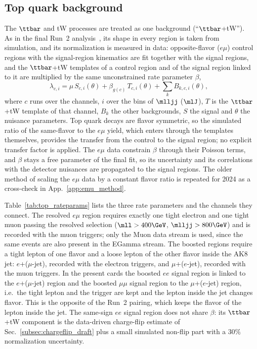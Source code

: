 \subsection{Top quark background}
\label{subsec:top_draft}

The $\ttbar$ and tW processes are treated as one background (``$\ttbar$+tW'').
As in the final Run~2 analysis~\cite{bib:AN19083}, its shape in every region is
taken from simulation, and its normalization is measured in data: opposite-flavor
($e\mu$) control regions with the signal-region kinematics are fit together
with the signal regions, and the $\ttbar$+tW templates of a control region and
of the signal region linked to it are multiplied by the same unconstrained
rate parameter $\beta$,
%
\begin{equation}
  \lambda_{c,i} = \mu\, S_{c,i}(\theta) + \beta_{g(c)}\, T_{c,i}(\theta)
                  + \sum_k B_{k,c,i}(\theta),
  \label{eq:top_model}
\end{equation}
%
where $c$ runs over the channels, $i$ over the bins of $\mlljj$ ($\mlJ$),
$T$ is the $\ttbar$+tW template of that channel, $B_k$ the other backgrounds,
$S$ the signal and $\theta$ the nuisance parameters. Top quark decays are
flavor symmetric, so the simulated ratio of the same-flavor to the $e\mu$
yield, which enters through the templates themselves, provides the transfer
from the control to the signal region; no explicit transfer factor is applied.
The $e\mu$ data constrain $\beta$ through their Poisson terms, and $\beta$ stays
a free parameter of the final fit, so its uncertainty and its correlations with
the detector nuisances are propagated to the signal regions. The older method
of scaling the $e\mu$ data by a constant flavor ratio is repeated for 2024 as a
cross-check in App.~\ref{app:emu_method}.

Table~\ref{tab:top_rateparams} lists the three rate parameters and the channels
they connect. The resolved $e\mu$ region requires exactly one tight electron
and one tight muon passing the resolved selection ($\mll > 400\GeV$,
$\mlljj > 800\GeV$) and is recorded with the muon triggers; only the Muon
data stream is used, since the same events are also present in the EGamma
stream. The boosted regions require a tight lepton of one flavor and a loose
lepton of the other flavor inside the AK8 jet: $e$+($\mu$-jet), recorded with
the electron triggers, and $\mu$+($e$-jet), recorded with the muon triggers.
In the present cards the boosted $ee$ signal region is linked to the
$e$+($\mu$-jet) region and the boosted $\mu\mu$ signal region to the
$\mu$+($e$-jet) region, i.e.\ the tight lepton and the trigger are kept and the
lepton inside the jet changes flavor. This is the opposite of the Run~2 pairing,
which keeps the flavor of the lepton inside the jet.
The same-sign $ee$ signal region does not share $\beta$: its $\ttbar$+tW
component is the data-driven charge-flip estimate of
Sec.~\ref{subsec:chargeflip_draft} plus a small simulated non-flip part with a
$30\%$ normalization uncertainty.

